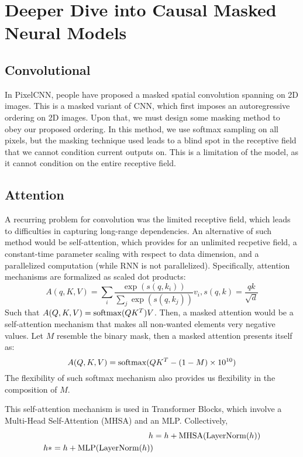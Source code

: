 \section{Deeper Dive into Causal Masked Neural Models}

\subsection{Convolutional}
In PixelCNN, people have proposed a masked spatial convolution spanning on 2D images.
This is a masked variant of CNN, which first imposes an autoregressive ordering on 2D images.
Upon that, we must design some masking method to obey our proposed ordering.
In this method, we use softmax sampling on all pixels, but the masking technique used leads to a blind spot in the receptive field that we cannot condition current outputs on.
This is a limitation of the model, as it cannot condition on the entire receptive field.

\subsection{Attention}
A recurring problem for convolution was the limited receptive field, which leads to difficulties in capturing long-range dependencies.
An alternative of such method would be self-attention, which provides for an unlimited recpetive field, a constant-time parameter scaling with respect to data dimension, and a parallelized computation (while RNN is not parallelized).
Specifically, attention mechanisms are formalized as scaled dot products:
\[
    A(q, K, V) = \sum_i \frac{\exp (s(q, k_i))}{\sum_j \exp (s(q, k_j))} v_i, s(q, k) = \frac{qk}{\sqrt{d}}
\]
Such that $A(Q, K, V) = {\rm softmax}(QK^T)V$.
Then, a masked attention would be a self-attention mechanism that makes all non-wanted elements very negative values. Let $M$ resemble the binary mask, then a masked attention presents itself as:
\[
    A(Q, K, V) = {\rm softmax}(QK^T - (1 - M) \times 10^{10})
\]
The flexibility of such softmax mechanism also provides us flexibility in the composition of $M$.

This self-attention mechanism is used in Transformer Blocks, which involve a Multi-Head Self-Attention (MHSA) and an MLP.
Collectively,
\begin{align*}
    h &= h + {\rm MHSA}({\rm LayerNorm}(h)) \\
    h *= h + {\rm MLP}({\rm LayerNorm}(h))
\end{align*}

